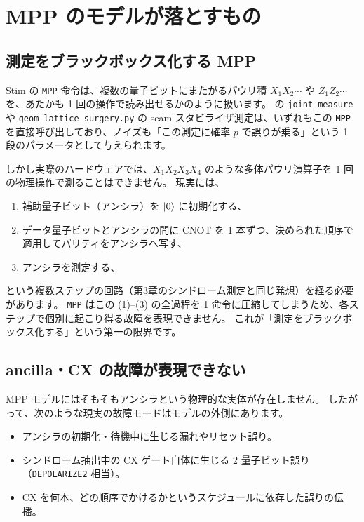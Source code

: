\section{MPP のモデルが落とすもの}\label{sec:mpp_limits}

\subsection{測定をブラックボックス化する MPP}

Stim の \texttt{MPP} 命令は、複数の量子ビットにまたがるパウリ積 $X_1 X_2 \cdots$ や $Z_1 Z_2 \cdots$ を、あたかも 1 回の操作で読み出せるかのように扱います。
 の \texttt{joint\_measure} や \texttt{geom\_lattice\_surgery.py} の seam スタビライザ測定は、いずれもこの \texttt{MPP} を直接呼び出しており、ノイズも「この測定に確率 $p$ で誤りが乗る」という 1 段のパラメータとして与えられます。

しかし実際のハードウェアでは、$X_1 X_2 X_3 X_4$ のような多体パウリ演算子を 1 回の物理操作で測ることはできません。
現実には、
\begin{enumerate}
  \item 補助量子ビット（アンシラ）を $\ket0$ に初期化する、
  \item データ量子ビットとアンシラの間に CNOT を 1 本ずつ、決められた順序で適用してパリティをアンシラへ写す、
  \item アンシラを測定する、
\end{enumerate}
という複数ステップの回路（第3章のシンドローム測定と同じ発想）を経る必要があります。
\texttt{MPP} はこの (1)–(3) の全過程を 1 命令に圧縮してしまうため、各ステップで個別に起こり得る故障を表現できません。
これが「測定をブラックボックス化する」という第一の限界です。

\subsection{ancilla・CX の故障が表現できない}

MPP モデルにはそもそもアンシラという物理的な実体が存在しません。
したがって、次のような現実の故障モードはモデルの外側にあります。

\begin{itemize}
  \item アンシラの初期化・待機中に生じる漏れやリセット誤り。
  \item シンドローム抽出中の CX ゲート自体に生じる 2 量子ビット誤り（\texttt{DEPOLARIZE2} 相当）。
  \item CX を何本、どの順序でかけるかというスケジュールに依存した誤りの伝播。
\end{itemize}


